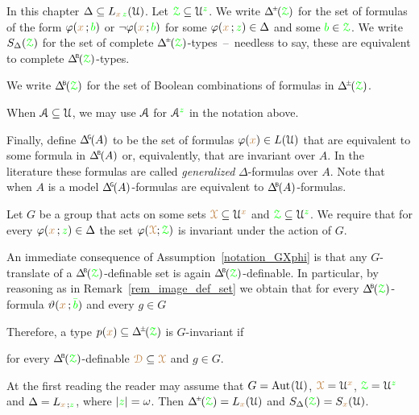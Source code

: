 In this chapter $\Delta\subseteq L_{{\color{brown} x}\,{\color{green} z}}(\EuScript U)$.
Let ${\color{green}\EuScript Z}\subseteq\EuScript U^{\color{green} z}$.
We write \emph{$\pmDelta(\grZ)$\/} for the set of formulas of the form $\varphi({\color{brown} x}\,;{\color{green} b})$ or $\neg\varphi({\color{brown} x}\,;{\color{green} b})$ for some $\varphi({\color{brown} x}\,;{\color{green} z})\in\Delta$ and some ${\color{green} b}\in{\color{green}\EuScript Z}$.
We write $S_\Delta({\color{green}\EuScript Z})$ for the set of complete $\pmDelta(\grZ)$-types~--~needless to say, these are equivalent to complete $\BDelta(\grZ)$-types.

We write \emph{$\BDelta(\grZ)$} for the set of Boolean combinations of formulas in $\pmDelta(\grZ)$.

When $\EuScript A\subseteq\EuScript U$, we may use $\EuScript A$ for $\EuScript A^{\color{green} z}$ in the notation above.

Finally, define \emph{$\GDelta(A)$\/} to be the set of formulas $\varphi({\color{brown} x})\in L(\EuScript U)$ that are equivalent to some formula in $\BDelta(A)$ or, equivalently, that are invariant over $A$.
In the literature these formulas are called \textit{generalized\/} $\Delta$-formulas over $A$.
Note that when $A$ is a model $\GDelta(A)$-formulas are equivalent to $\BDelta(A)$-formulas.

\begin{assumption}\label{notation_GXphi}
  Let $G$ be a group that acts on some sets ${{\color{brown}\EuScript X}}\subseteq\EuScript U^{\color{brown} x}$ and ${{\color{green}\EuScript Z}}\subseteq\EuScript U^{\color{green} z}$.
  We require that for every $\varphi({\color{brown} x}\,;{\color{green} z})\in\Delta$ the set $\varphi({\color{brown}\EuScript X};{\color{green}\EuScript Z})$ is invariant under the action of $G$.
\end{assumption}

An immediate consequence of Assumption~\ref{notation_GXphi} is that any $G$-translate of a $\BDelta({\grZ})$-definable set is again $\BDelta({\grZ})$-definable.
In particular, by reasoning as in Remark~\ref{rem_image_def_set} we obtain that for every $\BDelta({\grZ})$-formula $\vartheta({\color{brown} x}\,;{\color{green}\bar b})$ and every $g\in G$


Therefore, a type $p({\mr x})\subseteq \pmDelta(\grZ)$ is $G$-invariant if

\hfill for every $\BDelta({\grZ})$-definable ${\color{brown}\EuScript D}\subseteq{\color{brown}\EuScript X}$ and $g\in G$.

At the first reading the reader may assume that $G={\rm Aut\kern.15ex}(\EuScript U)$, ${\color{brown}\EuScript X}=\EuScript U^{\color{brown} x}$, ${\color{green}\EuScript Z}=\EuScript U^{\color{green} z}$ and $\Delta=L_{{\color{brown} x}\,;{\color{green} z}}$, where $|{\color{green} z}|=\omega$.
Then $\pmDelta(\grZ)=L_{\mr x}(\U)$ and  $S_\Delta({\color{green}\EuScript Z})=S_{\color{brown} x}(\EuScript U)$. 

